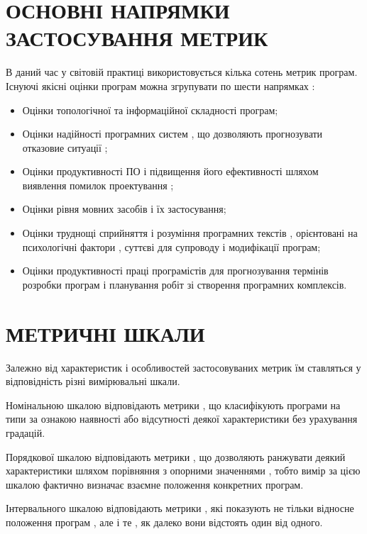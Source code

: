 \documentclass[oneside,final,14pt]{extreport}
\begin{document}
\section{ОСНОВНІ НАПРЯМКИ ЗАСТОСУВАННЯ МЕТРИК}
\label{2section:id4}
В даний час у світовій практиці використовується кілька сотень метрик програм. Існуючі якісні оцінки програм можна згрупувати по шести напрямках :
\begin{itemize}
\item {} 
Оцінки топологічної та інформаційної складності програм;

\item {} 
Оцінки надійності програмних систем , що дозволяють прогнозувати отказовие ситуації ;

\item {} 
Оцінки продуктивності ПО і підвищення його ефективності шляхом виявлення помилок проектування ;

\item {} 
Оцінки рівня мовних засобів і їх застосування;

\item {} 
Оцінки труднощі сприйняття і розуміння програмних текстів , орієнтовані на психологічні фактори , суттєві для супроводу і модифікації програм;

\item {} 
Оцінки продуктивності праці програмістів для прогнозування термінів розробки програм і планування робіт зі створення програмних комплексів.

\end{itemize}


\section{МЕТРИЧНІ ШКАЛИ}
\label{2section:id5}
Залежно від характеристик і особливостей застосовуваних метрик їм ставляться у відповідність різні вимірювальні шкали.

Номінальною шкалою відповідають метрики , що класифікують програми на типи за ознакою наявності або відсутності деякої характеристики без урахування градацій.

Порядкової шкалою відповідають метрики , що дозволяють ранжувати деякий характеристики шляхом порівняння з опорними значеннями , тобто вимір за цією шкалою фактично визначає взаємне положення конкретних програм.

Інтервального шкалою відповідають метрики , які показують не тільки відносне положення програм , але і те , як далеко вони відстоять один від одного.
\end{document}
